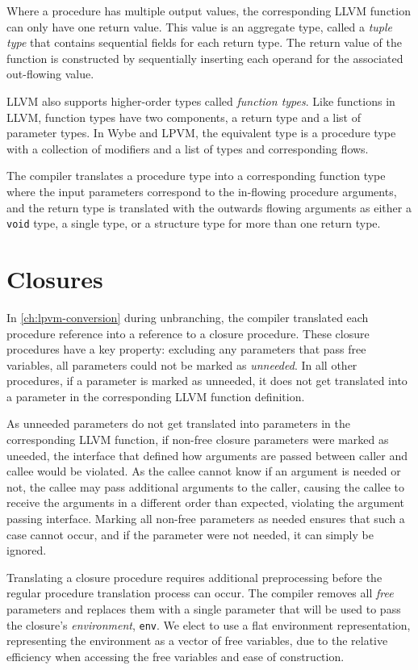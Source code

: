 Where a procedure has multiple output values, the corresponding LLVM function can only have one return value. This value is an aggregate type, called a \textit{tuple type} that contains sequential fields for each return type. The return value of the function is constructed by sequentially inserting each operand for the associated out-flowing value. 

LLVM also supports higher-order types called \textit{function types}. Like functions in LLVM, function types have two components, a return type and a list of parameter types. In Wybe and LPVM, the equivalent type is a procedure type with a collection of modifiers and a list of types and corresponding flows.

The compiler translates a procedure type into a corresponding function type where the input parameters correspond to the in-flowing procedure arguments, and the return type is translated with the outwards flowing arguments as either a \texttt{void} type, a single type, or a structure type for more than one return type.

\section{Closures}
\label{sec:llvm-closure-proc-refs}

In \cref{ch:lpvm-conversion} during unbranching, the compiler translated each procedure reference into a reference to a closure procedure. These closure procedures have a key property: excluding any parameters that pass free variables, all parameters could not be marked as \textit{unneeded}. In all other procedures, if a parameter is marked as unneeded, it does not get translated into a parameter in the corresponding LLVM function definition. 

As unneeded parameters do not get translated into parameters in the corresponding LLVM function, if non-free closure parameters were marked as uneeded, the interface that defined how arguments are passed between caller and callee would be violated. As the callee cannot know if an argument is needed or not, the callee may pass additional arguments to the caller, causing the callee to receive the arguments in a different order than expected, violating the argument passing interface. Marking all non-free parameters as needed ensures that such a case cannot occur, and if the parameter were not needed, it can simply be ignored.

Translating a closure procedure requires additional preprocessing before the regular procedure translation process can occur. The compiler removes all \textit{free} parameters and replaces them with a single parameter that will be used to pass the closure's \textit{environment}, \texttt{env}. We elect to use a flat environment representation, representing the environment as a vector of free variables, due to the relative efficiency when accessing the free variables and ease of construction.

